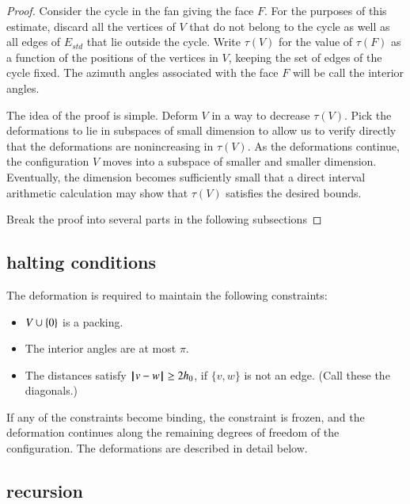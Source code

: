 \begin{proof}  Consider the cycle in the fan
giving the face $F$.  For the purposes of this
estimate,  discard all the vertices of $V$
that do not belong to the cycle as well as all edges
of $E_{std}$ that lie outside the cycle.
Write $\tau(V)$ for the value of $\tau(F)$ as a
function of the positions of the vertices in $V$,
keeping the set of edges of the cycle fixed.  The
azimuth angles associated with the face $F$ will be
call the interior angles.  

The idea of the proof is simple.   Deform $V$ in a way to decrease $\tau(V)$.  Pick the deformations to lie in subspaces of small dimension to allow us to verify directly that the deformations are nonincreasing in $\tau(V)$.  As the deformations continue, the configuration $V$ moves into a subspace of smaller and smaller dimension.  Eventually, the dimension becomes sufficiently small that a direct interval arithmetic calculation may show that $\tau(V)$ satisfies the desired bounds.

Break the proof into several parts in the following subsections
\end{proof}


\subsection{halting conditions}

The deformation is required to maintain the following
constraints:
\begin{itemize}
\item $V\cup\{0\}$ is a packing.
\item The interior angles are at most $\pi$.
\item The distances satisfy ${\hskip0.1em|\hskip-0.15em|\hskip0.1em}v - w{\hskip0.1em|\hskip-0.15em|\hskip0.1em}\ge 2{h_0}$, if $\{v,w\}$ is
not an edge.  (Call these the diagonals.)
\end{itemize}
If any of the constraints become binding, the
constraint is frozen, and the deformation continues along the remaining degrees of freedom of the configuration.  The deformations are described in detail below.

\subsection{recursion}

